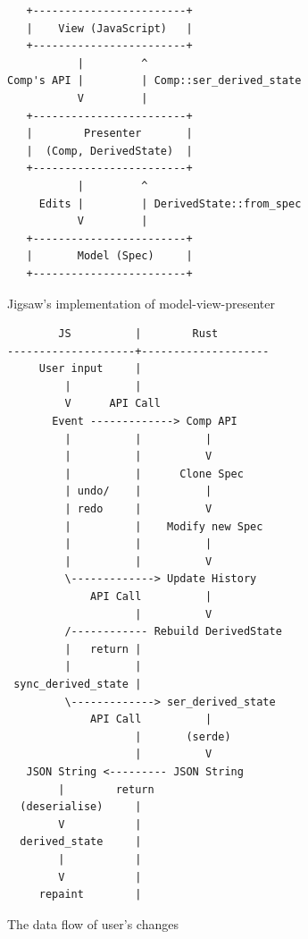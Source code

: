 \documentclass[12pt]{article}
\begin{document}

\begin{figure}
    \centering
    \begin{BVerbatim}
   +------------------------+
   |    View (JavaScript)   |
   +------------------------+
           |         ^
Comp's API |         | Comp::ser_derived_state
           V         |
   +------------------------+
   |        Presenter       |
   |  (Comp, DerivedState)  |
   +------------------------+
           |         ^
     Edits |         | DerivedState::from_spec
           V         |
   +------------------------+
   |       Model (Spec)     |
   +------------------------+
    \end{BVerbatim}
    \caption{Jigsaw's implementation of model-view-presenter}\label{fig:model-view-presenter}
\end{figure}

\begin{figure}
    \centering
    \begin{BVerbatim}
        JS          |        Rust
--------------------+--------------------
     User input     |
         |          |
         V      API Call
       Event -------------> Comp API
         |          |          |
         |          |          V
         |          |      Clone Spec
         | undo/    |          |
         | redo     |          V
         |          |    Modify new Spec
         |          |          |
         |          |          V
         \-------------> Update History
             API Call          |
                    |          V
         /------------ Rebuild DerivedState
         |   return |
         |          |
 sync_derived_state |
         \-------------> ser_derived_state
             API Call          |
                    |       (serde)
                    |          V
   JSON String <--------- JSON String
        |        return
  (deserialise)     |
        V           |
  derived_state     |
        |           |
        V           |
     repaint        |
    \end{BVerbatim}
    \caption{The data flow of user's changes}\label{fig:app-data-flow}
\end{figure}
\end{document}
